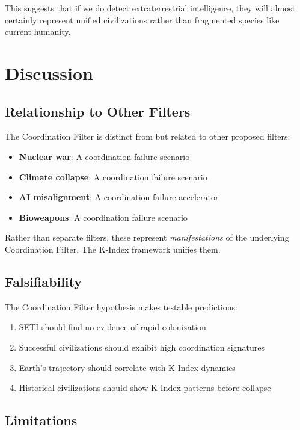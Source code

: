 \documentclass[11pt,a4paper]{article}
\begin{document}
This suggests that if we do detect extraterrestrial intelligence, they will almost certainly represent unified civilizations rather than fragmented species like current humanity.

\section{Discussion}

\subsection{Relationship to Other Filters}

The Coordination Filter is distinct from but related to other proposed filters:
\begin{itemize}
    \item \textbf{Nuclear war}: A coordination failure scenario
    \item \textbf{Climate collapse}: A coordination failure scenario
    \item \textbf{AI misalignment}: A coordination failure accelerator
    \item \textbf{Bioweapons}: A coordination failure scenario
\end{itemize}

Rather than separate filters, these represent \textit{manifestations} of the underlying Coordination Filter. The K-Index framework unifies them.

\subsection{Falsifiability}

The Coordination Filter hypothesis makes testable predictions:
\begin{enumerate}
    \item SETI should find no evidence of rapid colonization
    \item Successful civilizations should exhibit high coordination signatures
    \item Earth's trajectory should correlate with K-Index dynamics
    \item Historical civilizations should show K-Index patterns before collapse
\end{enumerate}

\subsection{Limitations}
\end{document}
